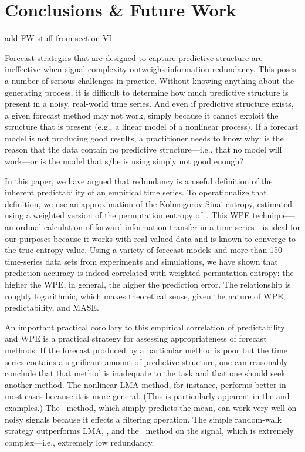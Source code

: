 \section{ Conclusions \& Future Work }\label{sec:conc}


\alert{add FW stuff from section VI}

Forecast strategies that are designed to capture predictive structure
are ineffective when signal complexity outweighs information
redundancy.  This poses a number of serious challenges in practice.
Without knowing anything about the generating process, it is difficult
to determine how much predictive structure is present in a noisy,
real-world time series.  And even if predictive structure exists, a
given forecast method may not work, simply because it cannot exploit
the structure that is present (e.g., a linear model of a nonlinear
process).  If a forecast model is not producing good results, a
practitioner needs to know why: is the reason that the data contain no
predictive structure---i.e., that no model will work---or is the model
that s/he is using simply not good enough?

In this paper, we have argued that redundancy is a useful definition
of the inherent predictability of an empirical time series.  To
operationalize that definition, we use an approximation of the
Kolmogorov-Sinai entropy, estimated using a weighted version of the
permutation entropy of~\cite{bandt2002per}.  This WPE technique---an
ordinal calculation of forward information transfer in a time
series---is ideal for our purposes because it works with real-valued
data and is known to converge to the true entropy value. Using a
variety of forecast models and more than 150 time-series data sets
from experiments and simulations, we have shown that prediction
accuracy is indeed correlated with weighted permutation entropy: the
higher the WPE, in general, the higher the prediction error.  The
relationship is roughly logarithmic, which makes theoretical sense,
given the nature of WPE, predictability, and MASE.

An important practical corollary to this empirical correlation of
predictability and WPE is a practical strategy for assessing
appropriateness of forecast methods.  If the forecast produced by a
particular method is poor but the time series contains a significant
amount of predictive structure, one can reasonably conclude that that
method is inadequate to the task and that one should seek another
method.  The nonlinear LMA method, for instance, performs better in
most cases because it is more general.  (This is particularly apparent
in the \col and \svdfive examples.)
The \naive ~method, which simply predicts the mean, can work very well
on noisy signals because it effects a filtering operation.  The simple
random-walk strategy outperforms LMA, \arima, and the \naive
~method on the \gcc signal, which is extremely complex---i.e.,
extremely low redundancy.

